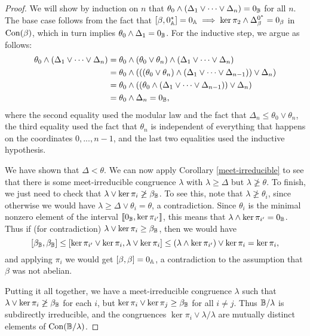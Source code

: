 \begin{appendices}
\begin{proof}
We will show by induction on $n$ that $\theta_0\wedge (\Delta_1 \vee \cdots \vee \Delta_n) = 0_{\mathbb{B}}$ for all $n$. The base case follows from the fact that $[\beta,0^*_{\mathbb{A}}] = 0_{\mathbb{A}} \implies \ker \pi_2 \wedge \Delta_\beta^{0^*} = 0_\beta$ in $\operatorname{Con}(\beta)$, which in turn implies $\theta_0 \wedge \Delta_1 = 0_{\mathbb{B}}$. For the inductive step, we argue as follows:
\begin{align*}
\theta_0\wedge (\Delta_1 \vee \cdots \vee \Delta_n) &= \theta_0\wedge (\theta_0\vee \theta_n)\wedge (\Delta_1 \vee \cdots \vee \Delta_n)\\
&= \theta_0 \wedge (((\theta_0\vee \theta_n) \wedge (\Delta_1 \vee \cdots \vee \Delta_{n-1})) \vee \Delta_n)\\
&= \theta_0 \wedge ((\theta_0 \wedge (\Delta_1 \vee \cdots \vee \Delta_{n-1})) \vee \Delta_n)\\
&= \theta_0 \wedge \Delta_n = 0_{\mathbb{B}},
\end{align*}
where the second equality used the modular law and the fact that $\Delta_n \le \theta_0\vee \theta_n$, the third equality used the fact that $\theta_n$ is independent of everything that happens on the coordinates $0, ..., n-1$, and the last two equalities used the inductive hypothesis.

We have shown that $\Delta < \theta$. We can now apply Corollary \ref{meet-irreducible} to see that there is some meet-irreducible congruence $\lambda$ with $\lambda \ge \Delta$ but $\lambda \not\ge \theta$. To finish, we just need to check that $\lambda \vee \ker \pi_i \not\ge \beta_{\mathbb{B}}$. To see this, note that $\lambda \not\ge \theta_i$, since otherwise we would have $\lambda \ge \Delta \vee \theta_i = \theta$, a contradiction. Since $\theta_i$ is the minimal nonzero element of the interval $\llbracket 0_{\mathbb{B}}, \ker \pi_{i'}\rrbracket$, this means that $\lambda \wedge \ker \pi_{i'} = 0_{\mathbb{B}}$. Thus if (for contradiction) $\lambda \vee \ker \pi_i \ge \beta_{\mathbb{B}}$, then we would have
\[
[\beta_{\mathbb{B}}, \beta_{\mathbb{B}}] \le [\ker \pi_{i'} \vee \ker \pi_i, \lambda \vee \ker \pi_i] \le (\lambda \wedge \ker \pi_{i'}) \vee \ker \pi_i = \ker \pi_i,
\]
and applying $\pi_i$ we would get $[\beta,\beta] = 0_{\mathbb{A}}$, a contradiction to the assumption that $\beta$ was not abelian.

Putting it all together, we have a meet-irreducible congruence $\lambda$ such that $\lambda \vee \ker \pi_i \not\ge \beta_{\mathbb{B}}$ for each $i$, but $\ker \pi_i \vee \ker \pi_j \ge \beta_{\mathbb{B}}$ for all $i \ne j$. Thus $\mathbb{B}/\lambda$ is subdirectly irreducible, and the congruences $\ker \pi_i \vee \lambda/\lambda$ are mutually distinct elements of $\operatorname{Con}(\mathbb{B}/\lambda)$.
\end{proof}


\end{appendices}
